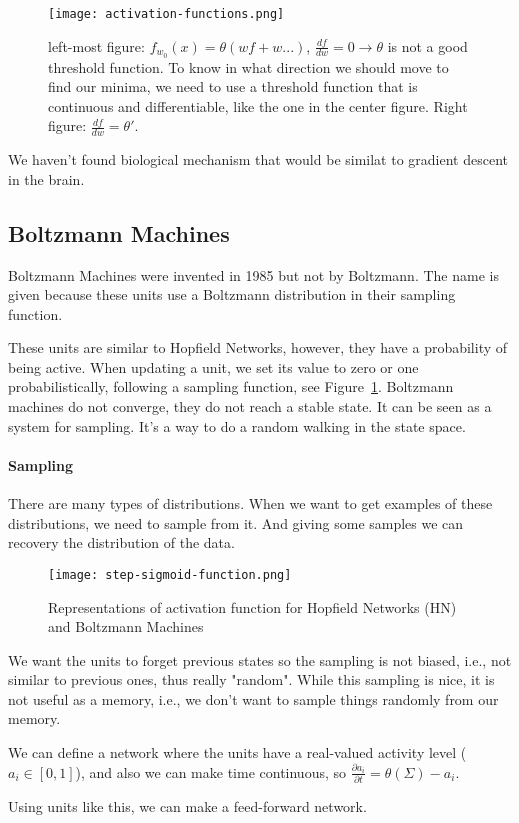 \documentclass[main]{subfiles}
\begin{document}
\begin{figure}[H]
	\centering
	\texttt{[image: activation-functions.png]}
	\caption{left-most figure: $f_{w_0} (x) = \theta(wf + w...)$, $\frac{df}{dw} = 0 \rightarrow \theta$ is not a good threshold function.
To know in what direction we should move to find our minima, we need to use a threshold function that is continuous and differentiable, like the one in the center figure.
Right figure: $\frac{df}{dw} = \theta\prime$.}
\end{figure}

We haven't found biological mechanism that would be similat to gradient descent in the brain.


\subsection{Boltzmann Machines}

Boltzmann Machines were invented in 1985 but not by Boltzmann.
The name is given because these units use a Boltzmann distribution in their sampling function.

These units are similar to Hopfield Networks, however, they have a probability of being active.
When updating a unit, we set its value to zero or one probabilistically, following a sampling function, see Figure~\ref{fig:step-sigmoid-function}.
Boltzmann machines do not converge, they do not reach a stable state.
It can be seen as a system for sampling. It's a way to do a random walking in the state space.

\paragraph{Sampling}
There are many types of distributions.
When we want to get examples of these distributions, we need to sample from it.
And giving some samples we can recovery the distribution of the data.

\begin{figure}[H]
	\centering
	\texttt{[image: step-sigmoid-function.png]}
	\caption{Representations of activation function for Hopfield Networks (HN) and Boltzmann Machines}
	\label{fig:step-sigmoid-function}
\end{figure}

We want the units to forget previous states so the sampling is not biased, i.e., not similar to previous ones, thus really "random".
While this sampling is nice, it is not useful as a memory, i.e., we don't want to sample things randomly from our memory.

We can define a network where the units have a real-valued activity level ($a_i \in [0,1]$), and also we can make time continuous, so $\frac{\partial a_i}{\partial t} = \theta(\Sigma)-a_i$.

Using units like this, we can make a feed-forward network.
\end{document}
